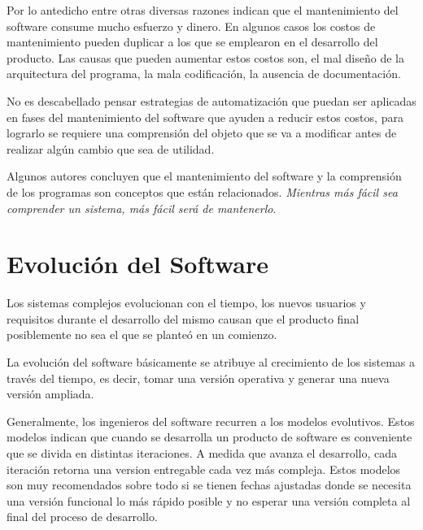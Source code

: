 \documentclass[a4paper,12pt]{report}
\begin{document}

Por lo antedicho entre otras diversas razones\cite{KBVR00} indican que el man\-tenimiento del software consume mucho esfuerzo y dinero. En algunos casos los costos de mantenimiento pueden duplicar a los que se emplearon en el desarro\-llo del producto. Las causas que pueden aumentar estos costos son, el mal diseño de la arquitectura del programa, la mala codificación, la ausencia de documentación.

No es descabellado pensar estrategias de automatización que puedan ser aplicadas en fases del mantenimiento del software que ayuden a reducir estos costos, para lograrlo se requiere una comprensión del objeto que se va a modificar antes de realizar algún cambio que sea de utilidad.
 
Algunos autores concluyen que el mantenimiento del software y la comprensión de los programas son conceptos que están relacionados. \textit{Mientras más fácil sea comprender un sistema, más fácil será de mantenerlo}.


\section{Evolución del Software}

Los sistemas complejos evolucionan con el tiempo, los nuevos usuarios y requisitos durante el desarrollo del mismo causan que el producto final posiblemente no sea el que se planteó en un comienzo. 

La evolución del software básicamente se atribuye al crecimiento de los sistemas a través del tiempo, es decir, tomar una versión operativa y generar una nueva versión ampliada\cite{KBVR00}.

Generalmente, los ingenieros del software recurren a los modelos evolutivos. Estos modelos indican que cuando se desarrolla un producto de software es conveniente que se divida en distintas iteraciones. A medida que avanza el desarrollo, cada iteración retorna una version entregable cada vez más compleja\cite{RSPMGH02}. Estos modelos son muy recomendados sobre todo si se tienen fechas ajustadas donde se necesita una versión funcional lo más rápido posible y no esperar una versión completa al final del proceso de desarrollo.
\end{document}
